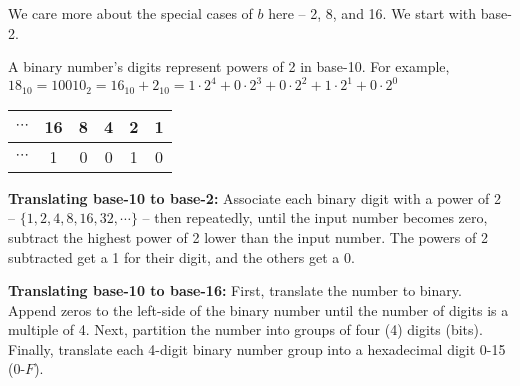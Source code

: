 \documentclass[main.tex]{subfiles}
\begin{document}
We care more about the special cases of \(b\) here -- 2, 8, and 16. We start with base-2.

A binary number's digits represent powers of 2 in base-10. For example, \(18_{10} = 10010_2 = 16_{10} + 2_{10} = 1 \cdot 2^4 + 0 \cdot 2^3 + 0 \cdot 2^2 + 1 \cdot 2^1 + 0 \cdot 2^0\)
\begin{center}
	\begin{tabular}{cccccc}
		\(\cdots\) & 16 & 8 & 4 & 2 & 1 \\
		\midrule
		\(\cdots\) & 1 & 0 & 0 & 1 & 0 \\
	\end{tabular}
\end{center}

\begin{boxx}
	\textbf{Translating base-10 to base-2:} Associate each binary digit with a power of 2 -- \(\{1,2,4,8,16,32,\cdots\}\) -- then repeatedly, until the input number becomes zero, subtract the highest power of 2 lower than the input number. The powers of 2 subtracted get a 1 for their digit, and the others get a 0.
\end{boxx}


\begin{boxx}
	\textbf{Translating base-10 to base-16:} First, translate the number to binary. Append zeros to the left-side of the binary number until the number of digits is a multiple of 4. Next, partition the number into groups of four (4) digits (bits). Finally, translate each 4-digit binary number group into a hexadecimal digit 0-15 (0-\(F\)).
\end{boxx}

\end{document}
